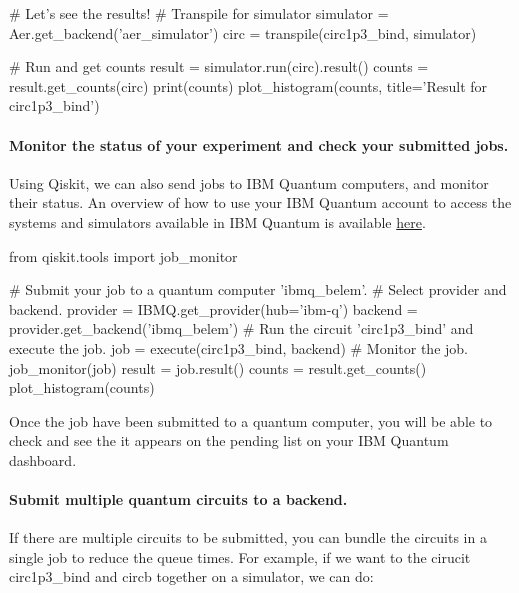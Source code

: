 \documentclass[%
oneside,                 %
final,                   %
10pt]{article}
\begin{document}
\bpycod
# Let's see the results! 
# Transpile for simulator
simulator = Aer.get_backend('aer_simulator')
circ = transpile(circ1p3_bind, simulator)

# Run and get counts
result = simulator.run(circ).result()
counts = result.get_counts(circ)
print(counts)    
plot_histogram(counts, title='Result for circ1p3_bind')

\epycod


\paragraph{Monitor the status of your experiment and check your submitted jobs.}
Using Qiskit, we can also send jobs to IBM Quantum computers, and monitor their status.
An overview of how to use your IBM Quantum account to access the systems and simulators available in IBM Quantum is available \href{{https://quantum-computing.ibm.com/lab/docs/iql/manage/account/ibmq}}{here}.



\bpycod
from qiskit.tools import job_monitor

\epycod














\bpycod
# Submit your job to a quantum computer 'ibmq_belem'.
# Select provider and backend.
provider = IBMQ.get_provider(hub='ibm-q') 
backend = provider.get_backend('ibmq_belem') 
# Run the circuit 'circ1p3_bind' and execute the job.
job = execute(circ1p3_bind, backend)
# Monitor the job.
job_monitor(job)
result = job.result()
counts = result.get_counts()
plot_histogram(counts)

\epycod


Once the job have been submitted to a quantum computer, you will be able to check and see the it appears on the pending list on your IBM Quantum dashboard.

\paragraph{Submit multiple quantum circuits to a backend.}
If there are multiple circuits to be submitted, you can bundle the
circuits in a single job to reduce the queue times. For example, if we
want to the cirucit circ1p3_bind and circb together on a simulator, we
can do:
\end{document}
